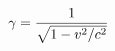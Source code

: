 \documentclass[preview]{standalone}
\begin{document}
\begin{align*}
\special{dvisvgm:raw <g id='unique000'>}\gamma = \frac{1}{\sqrt{1 - v^2/c^2}}\special{dvisvgm:raw </g>}
\end{align*}
\end{document}
